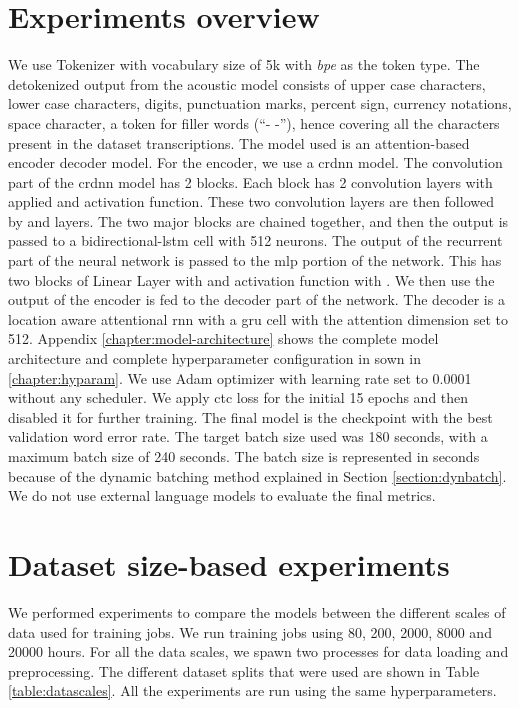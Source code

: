 \section{Experiments overview}
\label{section:exp_desc}
We use  Tokenizer with vocabulary size of 5k with \emph{bpe} as the token type. The detokenized output from the acoustic model consists of upper case characters, lower case characters, digits, punctuation marks, percent sign, currency notations, space character, a token for filler words (``- -''), hence covering all the characters present in the dataset transcriptions. The model used is an attention-based encoder decoder model. For the encoder, we use a \acrshort{crdnn} model. The convolution part of the \acrshort{crdnn} model has 2  blocks. Each block has 2 convolution layers with  applied and  activation function. These two convolution layers are then followed by  and  layers. The two major blocks are chained together, and then the output is passed to a bidirectional-\acrshort{lstm} cell with 512 neurons. The output of the recurrent part of the neural network is passed to the \acrshort{mlp} portion of the network. This has two blocks of Linear Layer with  and  activation function with . We then use the output of the encoder is fed to the decoder part of the network. The decoder is a location aware attentional \acrshort{rnn} with a \acrshort{gru} cell with the attention dimension set to 512. Appendix \ref{chapter:model-architecture} shows the complete model architecture and complete hyperparameter configuration in sown in \ref{chapter:hyparam}. We use Adam optimizer with learning rate set to 0.0001 without any scheduler. We apply \acrshort{ctc} loss for the initial 15 epochs and then disabled it for further training. The final model is the checkpoint with the best validation word error rate. The target batch size used was 180 seconds, with a maximum batch size of 240 seconds. The batch size is represented in seconds because of the dynamic batching method explained in Section \ref{section:dynbatch}. We do not use external language models to evaluate the final metrics.  

\section{Dataset size-based experiments}
\label{section:res_scale}
We performed experiments to compare the models between the different scales of data used for training jobs. We run training jobs using 80, 200, 2000, 8000 and 20000 hours. For all the data scales, we spawn two processes for data loading and preprocessing. The different dataset splits that were used are shown in Table \ref{table:datascales}. All the experiments are run using the same hyperparameters. 

